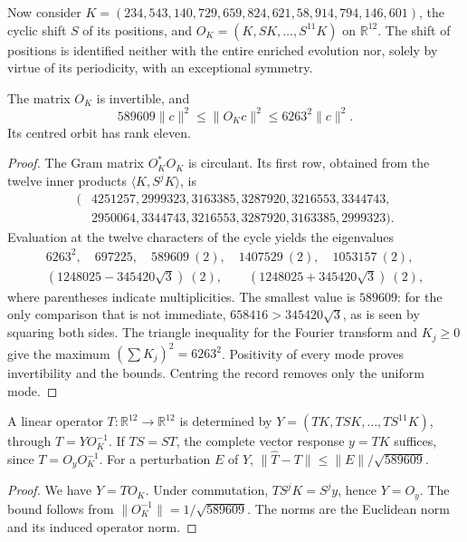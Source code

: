Now consider \(K=(234,543,140,729,659,824,621,58,914,794,146,601)\),
the cyclic shift \(S\) of its positions, and
\(O_K=(K,SK,\ldots,S^{11}K)\) on \(\mathbb R^{12}\).
The shift of positions is identified neither with the entire enriched
evolution nor, solely by virtue of its periodicity, with an exceptional symmetry.

\begin{theorem}
\label{iv:thm:acoplamiento-orbita}
The matrix \(O_K\) is invertible, and
\[
 589609\|c\|^2\leq\|O_Kc\|^2\leq6263^2\|c\|^2.
\]
Its centred orbit has rank eleven.
\end{theorem}
\begin{proof}
The Gram matrix \(O_K^*O_K\) is circulant. Its first row, obtained from
the twelve inner products \(\langle K,S^jK\rangle\), is
\[
 \begin{aligned}
 (&4251257,2999323,3163385,3287920,3216553,3344743,\\
  &2950064,3344743,3216553,3287920,3163385,2999323).
 \end{aligned}
\]
Evaluation at the twelve characters of the cycle yields the
eigenvalues
\[
 \begin{gathered}
 6263^2,\quad697225,\quad
 589609\ (2),\quad1407529\ (2),\quad1053157\ (2),\\
 (1248025-345420\sqrt3)\ (2),\qquad
 (1248025+345420\sqrt3)\ (2),
 \end{gathered}
\]
where parentheses indicate multiplicities. The smallest value is
\(589609\): for the only comparison that is not immediate,
\(658416>345420\sqrt3\), as is seen by squaring both sides.
The triangle inequality for the Fourier transform and \(K_j\geq0\)
give the maximum \((\sum K_j)^2=6263^2\).
Positivity of every mode proves invertibility and the bounds.
Centring the record removes only the uniform mode.
\end{proof}

\begin{corollary}
\label{iv:cor:acoplamiento-identificacion}
A linear operator \(T:\mathbb R^{12}\to\mathbb R^{12}\) is determined by
\(Y=(TK,TSK,\ldots,TS^{11}K)\), through \(T=YO_K^{-1}\).
If \(TS=ST\), the complete vector response \(y=TK\) suffices, since
\(T=O_yO_K^{-1}\). For a perturbation \(E\) of \(Y\),
\(\|\widehat T-T\|\leq\|E\|/\sqrt{589609}\).
\end{corollary}
\begin{proof}
We have \(Y=TO_K\). Under commutation, \(TS^jK=S^jy\), hence \(Y=O_y\).
The bound follows from
\(\|O_K^{-1}\|=1/\sqrt{589609}\).
The norms are the Euclidean norm and its induced operator norm.
\end{proof}

